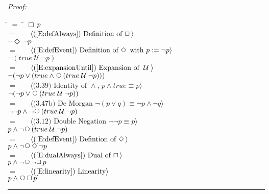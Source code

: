 \documentclass[fleqn, leqno]{article}
\newcommand{\lgap}{2pt}                             %
\newcommand{\mymathindent}{24pt}                    %
\newcommand{\Until}{\;\mathcal{U}\;}
\newcommand{\Next}{\;\,\text{\raisebox{3.5pt}{\circle{6}}}}
\newcommand{\Event}{\Diamond\,}
\newcommand{\Always}{\Box\,}
\newcommand{\myqed}{\rule[-.23ex]{1.2ex}{2.0ex}}
\newcommand{\myqedtab}{\hspace{388.5pt}}              %
\newcommand{\Gll} {\langle}                         %
\newcommand{\Ggg} {\rangle}                         %
\newcommand{\Hint}[1]     {\ \ \ $\Gll              \mbox{#1} \Ggg$ }   %
\begin{document}
\emph{Proof:}
\begin{tabbing}
\hspace{\mymathindent} \= $= \;$ \= \myqedtab \= \kill
  \> \>   $\Always p$\\[\lgap]
  \> $=$  \>  \Hint{(\ref{E:defAlways}) Definition of $\Always$}\\[\lgap]
  \> \>   $\neg\Event\neg p$\\[\lgap]
  \> $=$  \>  \Hint{(\ref{E:defEvent}) Definition of $\Event$ with $p := \neg p$}\\[\lgap]
  \> \>   $\neg(true \Until \neg p)$\\[\lgap]
  \> $=$  \>  \Hint{(\ref{E:expansionUntil}) Expansion of $\Until$}\\[\lgap]
  \> \>   $\neg(\neg p \lor (true \land \Next(true \Until \neg p)))$\\[\lgap]
  \> $=$  \>  \Hint{(3.39) Identity of $\land$, $p\land true\equiv p$}\\[\lgap]
  \> \>   $\neg(\neg p \lor \Next(true \Until \neg p))$\\[\lgap]
  \> $=$  \>  \Hint{(3.47b) De Morgan $\neg (p \lor q) \equiv \neg p \land \neg q$}\\[\lgap]
  \> \>   $\neg\neg p \land \neg\Next(true \Until \neg p)$\\[\lgap]
  \> $=$  \>  \Hint{(3.12) Double Negation $\neg\neg p\equiv p$}\\[\lgap]
  \> \>   $p \land \neg\Next(true \Until \neg p)$\\[\lgap]
  \> $=$  \>  \Hint{(\ref{E:defEvent}) Defintion of $\Event$}\\[\lgap]
  \> \>   $p \land \neg\Next\Event\neg p$\\[\lgap]
  \> $=$  \>  \Hint{(\ref{E:dualAlways}) Dual of $\Always$}\\[\lgap]
  \> \>   $p \land \neg\Next\neg\Always p$\\[\lgap]
  \> $=$  \>  \Hint{(\ref{E:linearity}) Linearity}\\[\lgap]
  \> \>   $p \land \Next\Always p$ \> \myqed
\end{tabbing}
\end{document}
